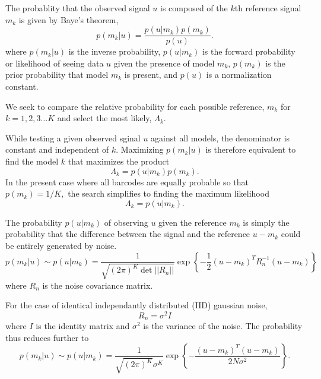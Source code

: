 The probablity that the observed signal $u$ is composed of the $k$th reference signal $m_k$ is given by Baye's theorem,
\begin{equation}\label{eq:Bayes}
p(m_k|u) = \frac{p(u|m_k)p(m_k)} {p(u)}.
\end{equation}
where $p(m_k|u)$ is the inverse probability, $p(u|m_k)$ is the forward probability or likelihood of seeing data $u$ given the presence of model $m_k$, $p(m_k)$ is the prior probability that model $m_k$ is present, and $p(u)$ is a normalization constant.

We seek to compare the relative  probability for each possible reference, $m_k$ for $k=1,2,3 \ldots K$ and select the most likely, $\Lambda_k$.  

While testing a given observed sginal $u$ against all models, the denominator is constant and independent of $k$. Maximizing $p(m_k|u)$ is therefore equivalent to find the model $k$ that maximizes the product
\begin{equation}
\Lambda_k = p(u|m_k)p(m_k).
\end{equation}
In the present case where all barcodes are equally probable so that
$p(m_k)=1/K,$ 
the search simplifies to finding the maximum likelihood 
\begin{equation}
\Lambda_k = p(u|m_k).
\end{equation}



The probability $p(u|m_k)$ of observing $u$ given the reference $m_k$  is simply the probability that the difference between the signal and the reference $u-m_k$ could be entirely generated by noise.
\begin{equation}
p(m_k|u)\sim p(u|m_k) = \frac{1}{  \sqrt{ (2\pi)^K \det || R_n||} } \exp\left\{ -\frac{1}{2}  (u-m_k)^T R_n^{-1} (u-m_k) \right\}
\end{equation}
where $R_n$ is the noise covariance matrix. 

For the case of identical independantly distributed (IID) gaussian noise, 
\begin{equation}
R_n=\sigma^2 I
\end{equation}
where $I$ is the identity matrix and $\sigma^2$ is the variance of the noise. The probability thus reduces further to
\begin{equation}\label{eq:iidEnergy}
p(m_k|u)\sim p(u|m_k) = \frac{1}{  \sqrt{ (2\pi)^K} \sigma^K  } \exp\left\{ -\frac{(u-m_k)^T(u-m_k)} {2 N \sigma^2 } \right\}.
\end{equation}

